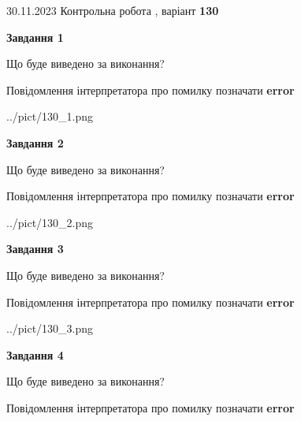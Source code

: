 \documentclass[12pt, ukrainian]{article}
\begin{document}
{{30.11.2023 Контрольна робота , варіант  \No \textbf { 130 }\par}}
{




{\begin {center}\textbf{Завдання 1}\end {center}}\par
Що буде виведено за виконання? \par
Повідомлення інтерпретатора про помилку позначати \textbf{error}

\begin{center}
	{../pict/130_1.png}
\end{center}
\newpage

{\begin {center}\textbf{Завдання 2}\end {center}}\par
Що буде виведено за виконання? \par
Повідомлення інтерпретатора про помилку позначати \textbf{error}

\begin{center}
	{../pict/130_2.png}
\end{center}
\newpage

{\begin {center}\textbf{Завдання 3}\end {center}}\par
Що буде виведено за виконання? \par
Повідомлення інтерпретатора про помилку позначати \textbf{error}

\begin{center}
	{../pict/130_3.png}
\end{center}
\newpage

{\begin {center}\textbf{Завдання 4}\end {center}}\par
Що буде виведено за виконання? \par
Повідомлення інтерпретатора про помилку позначати \textbf{error}

}
\end{document}

